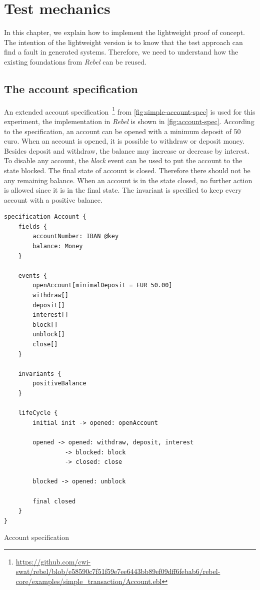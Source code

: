 \chapter{Test mechanics}\label{sec:ch3}

In this chapter, we explain how to implement the lightweight proof of concept. The intention of the lightweight version is to know that the test approach can find a fault in generated systems. Therefore, we need to understand how the existing foundations from \textit{Rebel} can be reused.

\section{The account specification}
An extended account specification~\footnote{\url{https://github.com/cwi-swat/rebel/blob/e58590c7f51f59e7ee6443bb89ef09dff6febab6/rebel-core/examples/simple_transaction/Account.ebl}} from \autoref{fig:simple-account-spec} is used for this experiment, the implementation in \textit{Rebel} is shown in \autoref{fig:account-spec}. According to the specification, an account can be opened with a minimum deposit of 50 euro. When an account is opened, it is possible to withdraw or deposit money. Besides deposit and withdraw, the balance may increase or decrease by interest. To disable any account, the \textit{block} event can be used to put the account to the state blocked. The final state of account is closed. Therefore there should not be any remaining balance. When an account is in the state closed, no further action is allowed since it is in the final state. The invariant is specified to keep every account with a positive balance.


\begin{sourcecode}[h!]
\begin{lstlisting}[]
specification Account {
	fields {
		accountNumber: IBAN @key
		balance: Money
	}

	events {
		openAccount[minimalDeposit = EUR 50.00]
		withdraw[]
		deposit[]
		interest[]
		block[]
		unblock[]
		close[]
	}

	invariants {
		positiveBalance
	}

	lifeCycle {
		initial init -> opened: openAccount

		opened -> opened: withdraw, deposit, interest
			     -> blocked: block
			     -> closed: close

		blocked -> opened: unblock

		final closed
	}
}
\end{lstlisting}
\caption{Account specification}\label{fig:account-spec}
\end{sourcecode}
\FloatBarrier

